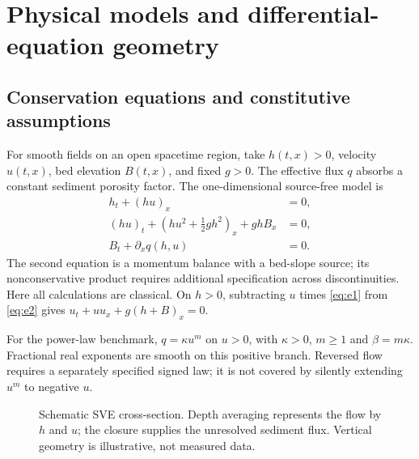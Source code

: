 \documentclass[11pt,a4paper,oneside]{report}
\numberwithin{equation}{chapter}
\begin{document}
\chapter{Physical models and differential-equation geometry}\label{ch:models}
\section{Conservation equations and constitutive assumptions}
For smooth fields on an open spacetime region, take $h(t,x)>0$, velocity $u(t,x)$, bed elevation $B(t,x)$, and fixed $g>0$. The effective flux $q$ absorbs a constant sediment porosity factor. The one-dimensional source-free model is
\begin{align}
h_t+(hu)_x&=0,\label{eq:e1}\\
(hu)_t+(hu^2+\tfrac12gh^2)_x+ghB_x&=0,\label{eq:e2}\\
B_t+\partial_xq(h,u)&=0.\label{eq:e3}
\end{align}
The second equation is a momentum balance with a bed-slope source; its nonconservative product requires additional specification across discontinuities. Here all calculations are classical. On $h>0$, subtracting $u$ times \eqref{eq:e1} from \eqref{eq:e2} gives $u_t+uu_x+g(h+B)_x=0$.

For the power-law benchmark, $q=\kappa u^m$ on $u>0$, with $\kappa>0$, $m\ge1$ and $\beta=m\kappa$. Fractional real exponents are smooth on this positive branch. Reversed flow requires a separately specified signed law; it is not covered by silently extending $u^m$ to negative $u$.

\begin{figure}[htbp]\centering
{}
\caption{Schematic SVE cross-section. Depth averaging represents the flow by $h$ and $u$; the closure supplies the unresolved sediment flux. Vertical geometry is illustrative, not measured data.}\label{fig:physical}
\end{figure}
\end{document}
